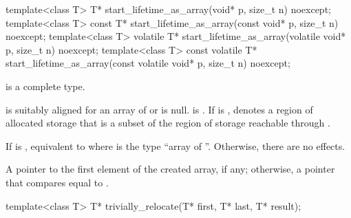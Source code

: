 %
\begin{itemdecl}
template<class T>
  T* start_lifetime_as_array(void* p, size_t n) noexcept;
template<class T>
  const T* start_lifetime_as_array(const void* p, size_t n) noexcept;
template<class T>
  volatile T* start_lifetime_as_array(volatile void* p, size_t n) noexcept;
template<class T>
  const volatile T* start_lifetime_as_array(const volatile void* p, size_t n) noexcept;
\end{itemdecl}

\begin{itemdescr}
\pnum
\mandates
{} is a complete type.

\pnum
\expects
{} is suitably aligned for an array of  or is null.
 is .
If  is ,
 denotes
a region of allocated storage that is
a subset of the region of storage
reachable through .

\pnum
\effects
If  is ,
equivalent to
where  is the type ``array of  ''.
Otherwise, there are no effects.

\pnum
\returns
A pointer to the first element of the created array,
if any;
otherwise,
a pointer that compares equal to .
\end{itemdescr}

%
\begin{itemdecl}
template<class T>
  T* trivially_relocate(T* first, T* last, T* result);
\end{itemdecl}

